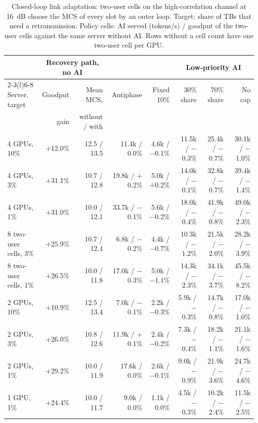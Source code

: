 \documentclass[acmsmall,screen,review,anonymous]{acmart}
\newcommand{\sys}{Antiphase\xspace}
\begin{document}
\begin{table}[t]
\caption{Closed-loop link adaptation: two-user cells on the high-correlation channel at 16~dB choose the MCS
of every slot by an outer loop. Target: share of TBs that need a retransmission. Policy cells: AI served
(tokens/s) / goodput of the two-user cells against the same server without AI. Rows without a cell count
have one two-user cell per GPU.}
\label{tab:closedloop}
\footnotesize
\setlength{\tabcolsep}{2.5pt}
\begin{tabular}{@{}lrrrrrrr@{}}
\toprule
 & \multicolumn{2}{c}{Recovery path, no AI} & & & \multicolumn{3}{c}{Low-priority AI} \\
\cmidrule(lr){2-3}\cmidrule(l){6-8}
Server, target & Goodput & Mean MCS, & \sys & Fixed 10\% & 30\% share & 70\% share & No cap \\
 & gain & without / with & & & & & \\
\midrule
4 GPUs, 10\% & $+$12.0\% & 12.5 / 13.5 & 11.4k / 0.0\% & 4.6k / $-$0.1\% & 11.5k / $-$0.3\% & 25.4k / $-$0.7\% & 30.1k / $-$1.0\% \\
4 GPUs, 3\% & $+$31.1\% & 10.7 / 12.8 & 19.8k / $+$0.2\% & 5.0k / $+$0.2\% & 14.0k / $-$0.1\% & 32.8k / $-$0.7\% & 39.4k / $-$1.4\% \\
4 GPUs, 1\% & $+$31.0\% & 10.0 / 12.1 & 33.7k / $-$0.1\% & 5.6k / $-$0.2\% & 18.0k / $-$0.4\% & 41.9k / $-$0.8\% & 49.0k / $-$2.3\% \\
8 two-user cells, 3\% & $+$25.9\% & 10.7 / 12.4 & 6.8k / $-$0.2\% & 4.4k / $-$0.7\% & 10.3k / $-$1.2\% & 21.5k / $-$2.0\% & 28.2k / $-$3.9\% \\
8 two-user cells, 1\% & $+$26.5\% & 10.0 / 11.8 & 17.0k / $-$0.3\% & 5.0k / $-$1.1\% & 14.3k / $-$2.3\% & 34.1k / $-$3.7\% & 45.5k / $-$8.2\% \\
2 GPUs, 10\% & $+$10.9\% & 12.5 / 13.4 & 7.0k / $-$0.1\% & 2.2k / $-$0.3\% & 5.9k / $-$0.3\% & 14.7k / $-$0.8\% & 17.0k / $-$1.0\% \\
2 GPUs, 3\% & $+$26.0\% & 10.8 / 12.6 & 11.9k / $+$0.1\% & 2.4k / $-$0.2\% & 7.3k / $-$0.4\% & 18.2k / $-$1.1\% & 21.1k / $-$1.6\% \\
2 GPUs, 1\% & $+$29.2\% & 10.0 / 11.9 & 17.6k / 0.0\% & 2.6k / $-$0.1\% & 9.0k / $-$0.9\% & 21.9k / $-$3.6\% & 24.7k / $-$4.6\% \\
1 GPU, 1\% & $+$24.4\% & 10.0 / 11.7 & 9.0k / 0.0\% & 1.1k / 0.0\% & 4.5k / $-$0.3\% & 10.2k / $-$2.4\% & 11.5k / $-$2.5\% \\
\bottomrule
\end{tabular}
\end{table}
\end{document}

